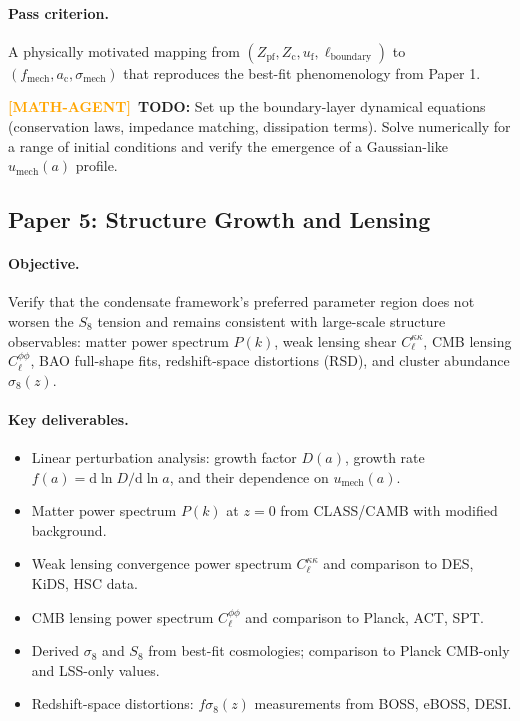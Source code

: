 \documentclass[11pt,a4paper]{article}
\newcommand{\dx}{\mathrm{d}}
\newcommand{\ac}{a_{\mathrm{c}}}
\newcommand{\sigmamech}{\sigma_{\mathrm{mech}}}
\newcommand{\fmech}{f_{\mathrm{mech}}}
\newcommand{\umech}{u_{\mathrm{mech}}}
\newcommand{\Zpf}{Z_{\mathrm{pf}}}
\newcommand{\Zcond}{Z_{\mathrm{c}}}
\newcommand{\uf}{u_{\mathrm{f}}}
\theoremstyle{definition}
\newcommand{\MATHAGENT}{\textcolor{orange}{\textbf{[MATH-AGENT]}}}
\begin{document}
\paragraph{Pass criterion.}
A physically motivated mapping from $(\Zpf, \Zcond, \uf, \ell_{\mathrm{boundary}})$ to $(\fmech, \ac, \sigmamech)$ that reproduces the best-fit phenomenology from Paper 1.

\MATHAGENT~\textbf{TODO:} Set up the boundary-layer dynamical equations (conservation laws, impedance matching, dissipation terms). Solve numerically for a range of initial conditions and verify the emergence of a Gaussian-like $\umech(a)$ profile.

\subsection{Paper 5: Structure Growth and Lensing}
\label{sec:paper5}

\paragraph{Objective.}
Verify that the condensate framework's preferred parameter region does not worsen the $S_8$ tension and remains consistent with large-scale structure observables: matter power spectrum $P(k)$, weak lensing shear $C_\ell^{\kappa\kappa}$, CMB lensing $C_\ell^{\phi\phi}$, BAO full-shape fits, redshift-space distortions (RSD), and cluster abundance $\sigma_8(z)$.

\paragraph{Key deliverables.}
\begin{itemize}[leftmargin=1.8em]
  \item Linear perturbation analysis: growth factor $D(a)$, growth rate $f(a) = \dx \ln D/\dx \ln a$, and their dependence on $\umech(a)$.
  \item Matter power spectrum $P(k)$ at $z = 0$ from CLASS/CAMB with modified background.
  \item Weak lensing convergence power spectrum $C_\ell^{\kappa\kappa}$ and comparison to DES, KiDS, HSC data.
  \item CMB lensing power spectrum $C_\ell^{\phi\phi}$ and comparison to Planck, ACT, SPT.
  \item Derived $\sigma_8$ and $S_8$ from best-fit cosmologies; comparison to Planck CMB-only and LSS-only values.
  \item Redshift-space distortions: $f\sigma_8(z)$ measurements from BOSS, eBOSS, DESI.
\end{itemize}
\end{document}
